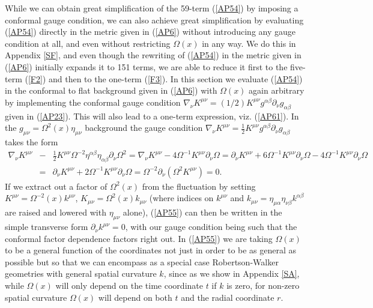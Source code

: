 \documentclass[aps]{revtex4}
\begin{document}
While we can obtain great simplification of the 59-term (\ref{AP54}) by imposing a conformal gauge condition, we can also achieve great simplification by evaluating (\ref{AP54}) directly in the metric given in (\ref{AP6}) without introducing any gauge condition at all, and even without restricting $\Omega(x)$ in any way. We do this in Appendix \ref{SF}, and  even though the rewriting of (\ref{AP54}) in the metric given in (\ref{AP6}) initially expands it to 151 terms, we are able to reduce it first to the five-term (\ref{F2}) and then to the one-term (\ref{F3}). In this section we evaluate (\ref{AP54}) in the conformal to flat background given in (\ref{AP6}) with $\Omega(x)$ again arbitrary by implementing the conformal gauge condition $\nabla_{\nu}K^{\mu\nu}=(1/2)K^{\mu\nu}g^{\alpha\beta}\partial_{\nu}g_{\alpha\beta}$ given in (\ref{AP23}). This will also lead to a one-term expression, viz. (\ref{AP61}). In the  $g_{\mu\nu}=\Omega^2(x)\eta_{\mu\nu}$ background  the gauge condition $\nabla_{\nu}K^{\mu\nu}=\frac{1}{2}K^{\mu\nu}g^{\alpha\beta}\partial_{\nu}g_{\alpha\beta}$ takes the form
%
\begin{eqnarray}
\nabla_{\nu}K^{\mu\nu}&-&\frac{1}{2}K^{\mu\nu}\Omega^{-2}\eta^{\alpha\beta}\eta_{\alpha\beta}\partial_{\nu}\Omega^2=\nabla_{\nu}K^{\mu\nu}-4\Omega^{-1}K^{\mu\nu}\partial_{\nu}\Omega
=\partial_{\nu}K^{\mu\nu}+6\Omega^{-1}K^{\mu\nu}\partial_{\nu}\Omega-4\Omega^{-1}K^{\mu\nu}\partial_{\nu}\Omega
\nonumber\\
&=&\partial_{\nu}K^{\mu\nu}+2\Omega^{-1}K^{\mu\nu}\partial_{\nu}\Omega=\Omega^{-2}\partial_{\nu}(\Omega^{2}K^{\mu\nu})=0. 
\label{AP55}
\end{eqnarray}
%
If we extract out a factor of $\Omega^2(x)$ from the fluctuation by setting $K^{\mu\nu}=\Omega^{-2}(x)k^{\mu\nu}$,  $K_{\mu\nu}=\Omega^{2}(x)k_{\mu\nu}$ (where indices on $k^{\mu\nu}$ and $k_{\mu\nu}=\eta_{\mu\alpha}\eta_{\nu\beta}k^{\alpha\beta}$ are raised and lowered with $\eta_{\mu\nu}$ alone), (\ref{AP55}) can then be written in the simple transverse form $\partial_{\nu}k^{\mu\nu}=0$, with our gauge condition being such that the conformal factor dependence factors right out. In (\ref{AP55}) we are taking $\Omega(x)$ to be a general function of the coordinates not just in order to be as general as possible but so that we can encompass as a special case Robertson-Walker geometries with general spatial curvature $k$, since as we show in Appendix \ref{SA}, while $\Omega(x)$ will only depend on the time coordinate $t$ if $k$ is zero, for non-zero spatial curvature $\Omega(x)$ will depend on both $t$ and the radial coordinate $r$.
\end{document}
